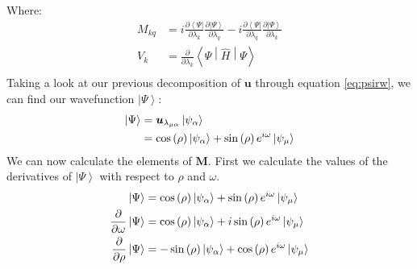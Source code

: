 \documentclass{aux/ttuthes2007}
\newcommand{\bra}[1]{\ensuremath{\left\langle#1\right\vert}}
\newcommand{\ket}[1]{\ensuremath{\left|#1\right\rangle}}
\newcommand{\sandwich}[3]{\left< #1 \middle\vert #2 \middle\vert #3 \right>}
\newcommand{\s}[1]{\sin\left( #1 \right)}
\newcommand{\co}[1]{\cos\left( #1 \right)}
\newcommand{\pd}[1]{\frac{\partial}{\partial #1}}
\newcommand{\kpp}[1]{\frac{\partial \ket\Psi}{\partial #1}}
\newcommand{\bpp}[1]{\frac{\partial \bra\Psi}{\partial #1}}
\newcommand{\ind}[1]{{\uo #1 \oo #1}}
\newcommand{\uo}[1]{
		\IfEqCase{#1}{
			{0}{\mu}
			{1}{\nu}
			{2}{\xi}
		}[\PackageError{uo}{Undefined option to uo: #1}{}]
}
\newcommand{\oo}[1]{
		\IfEqCase{#1}{
			{0}{\alpha}
			{1}{\beta}
			{2}{\gamma}
		}[\PackageError{unocorb}{Undefined option to unuo: #1}{}]
}
\begin{document}
%
Where:
\begin{equation*}
	\begin{split}
	M_{kq} 
	&= 
	 	i \bpp{\lambda_k} \kpp{\lambda_q} - i \bpp{\lambda_q} \kpp{\lambda_k} 
	\\
	V_k 
	&= 	\pd{\lambda_k}\sandwich{\Psi}{\hat H}{\Psi} \\
	\end{split}
\end{equation*}
%
Taking a look at our previous decomposition of $\bm u$ through equation \ref{eq:psirw}, we can find our wavefunction $\ket\Psi$:
%
\begin{equation*}
	\begin{split}
	\ket \Psi 
	&= \bm u_{\lambda_\ind 0} \ket {\psi_{\oo 0}} \\
	&= \co {\rho} \ket {\psi_{\oo 0}} + \s {\rho}e^{i\omega} \ket{\psi_{\uo 0}} \\
	\end{split}
\end{equation*}
%
We can now calculate the elements of $\bm M$. First we calculate the values of the derivatives of $\ket \Psi$ with respect to $\rho$ and $\omega$.
%
\begin{equation*}
	\begin{split}
		\ket{\Psi} 
		&= \co{\rho}\ket{\psi_{\oo {0}}} + \s\rho e^{i\omega}\ket{\psi_{\uo {0}}} 
		\\
		\pd\omega\ket\Psi 
		&= \co\rho\ket{\psi_{\oo {0}}} + i\s\rho e^{i\omega}\ket{\psi_{\uo {0}}} 
		\\
		\pd\rho\ket\Psi 
		&= -\s\rho\ket{\psi_{\oo {0}}} + \co\rho e^{i\omega}\ket{\psi_{\uo {0}}} 
	\end{split}
\end{equation*}
\end{document}
